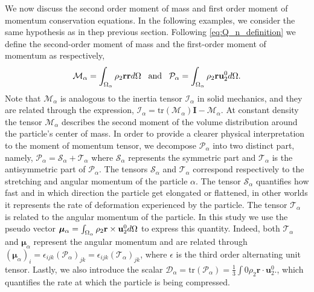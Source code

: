 We now discuss the second order moment of mass and first order moment of momentum conservation equations. 
In the following examples, we consider the same hypothesis as in thep previous section. 
Following \ref{eq:Q_n_definition} we define the second-order moment of mass and the first-order moment of momentum as respectively,
\begin{equation}
    \mathcal{M}_\alpha 
    = \int_{\Omega_\alpha}  \rho_2 \textbf{r} \textbf{r}  d\Omega
    \;\;\;\text{and}\;\;\;
    \mathcal{P}_\alpha 
    = \int_{\Omega_\alpha}  \rho_2 \textbf{r} \textbf{u}_2^0  d\Omega.
    \label{eq:first_moment_of_momentum_def}
\end{equation}
Note that $\mathcal{M}_\alpha$ is analogous to the inertia tensor $\mathcal{I}_\alpha$ in solid mechanics, and they are related through the expression, $\mathcal{I}_\alpha = \text{tr}(\mathcal{M}_\alpha)\textbf{I} - \mathcal{M}_\alpha$.
At constant density the tensor $\mathcal{M}_\alpha$ describes the second moment of the volume distribution around the particle's center of mass.
In order to provide a clearer physical interpretation to the moment of momentum tensor, we decompose $\mathcal{P}_\alpha$ into two distinct part, namely,
$\mathcal{P}_\alpha = \mathcal{S}_\alpha+\mathcal{T}_\alpha$ where $\mathcal{S}_\alpha$ represents the symmetric part and $\mathcal{T}_\alpha$ is the antisymmetric part of $\mathcal{P}_\alpha$.
The tensors $\mathcal{S}_\alpha$ and $\mathcal{T}_\alpha$ correspond respectively to the stretching and angular momentum of the particle $\alpha$. 
The tensor $\mathcal{S}_\alpha$ quantifies how fast and in which direction the particle get elongated or flattened, in other worlds it represents the rate of deformation experienced by the particle.
The tensor $\mathcal{T}_\alpha$ is related to the angular momentum of the particle. 
In this study we use the pseudo vector $\bm{\mu}_\alpha = \int_{\Omega_\alpha}  \rho_2 \textbf{r} \times \textbf{u}_2^0  d\Omega$ to express this quantity. 
Indeed, both  $\mathcal{T}_\alpha$ and $\bm{\mu}_\alpha$ represent the angular momentum and are related through $(\bm{\mu}_\alpha)_i = \epsilon_{ijk} (\mathcal{P}_\alpha)_{jk}= \epsilon_{ijk} (\mathcal{T}_\alpha)_{jk}$, where $\epsilon$ is the third order alternating unit tensor. 
Lastly, we also introduce the scalar $\mathcal{D}_\alpha = \text{tr}(\mathcal{P}_\alpha) = \frac{1}{3}\int0{ \rho_2 \textbf{r} \cdot \textbf{u}_2^0 }.$, which quantifies the rate at which the particle is being compressed.

